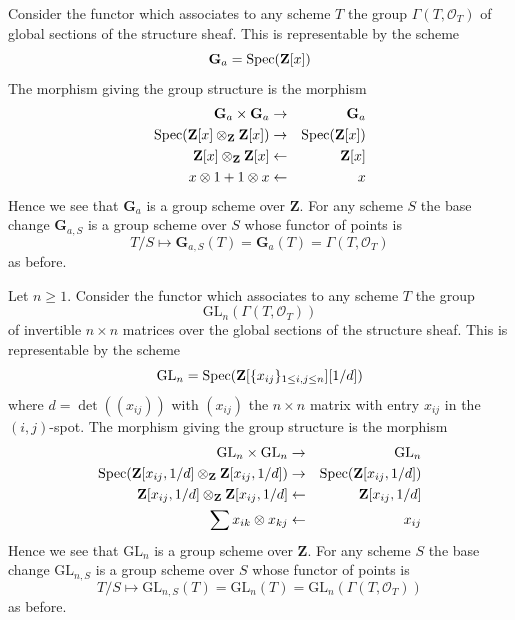 \begin{example}
\label{example-additive-group}
Consider the functor which associates
to any scheme $T$ the group $\Gamma(T, \mathcal{O}_T)$
of global sections of the structure sheaf.
This is representable by the scheme
$$
\mathbf{G}_a = \mathop{\mathrm{Spec}}(\mathbf{Z}[x])
$$
The morphism giving the group structure is the morphism
\begin{eqnarray*}
\mathbf{G}_a \times \mathbf{G}_a & \to & \mathbf{G}_a \\
\mathop{\mathrm{Spec}}(\mathbf{Z}[x] \otimes_{\mathbf{Z}} \mathbf{Z}[x])
& \to &
\mathop{\mathrm{Spec}}(\mathbf{Z}[x]) \\
\mathbf{Z}[x] \otimes_{\mathbf{Z}} \mathbf{Z}[x]
& \leftarrow &
\mathbf{Z}[x] \\
x \otimes 1 + 1 \otimes x & \leftarrow & x
\end{eqnarray*}
Hence we see that $\mathbf{G}_a$ is a group scheme over $\mathbf{Z}$.
For any scheme $S$ the base change $\mathbf{G}_{a, S}$ is a
group scheme over $S$ whose functor of points is
$$
T/S
\longmapsto
\mathbf{G}_{a, S}(T) = \mathbf{G}_a(T) = \Gamma(T, \mathcal{O}_T)
$$
as before.
\end{example}

\begin{example}
\label{example-general-linear-group}
Let $n \geq 1$.
Consider the functor which associates
to any scheme $T$ the group
$$
\text{GL}_n(\Gamma(T, \mathcal{O}_T))
$$
of invertible $n \times n$ matrices over
the global sections of the structure sheaf.
This is representable by the scheme
$$
\text{GL}_n = \mathop{\mathrm{Spec}}(\mathbf{Z}[\{x_{ij}\}_{1 \leq i, j \leq n}][1/d])
$$
where $d = \det((x_{ij}))$ with $(x_{ij})$ the $n \times n$ matrix
with entry $x_{ij}$ in the $(i, j)$-spot.
The morphism giving the group structure is the morphism
\begin{eqnarray*}
\text{GL}_n \times \text{GL}_n & \to & \text{GL}_n \\
\mathop{\mathrm{Spec}}(\mathbf{Z}[x_{ij}, 1/d] \otimes_{\mathbf{Z}}
\mathbf{Z}[x_{ij}, 1/d])
& \to &
\mathop{\mathrm{Spec}}(\mathbf{Z}[x_{ij}, 1/d]) \\
\mathbf{Z}[x_{ij}, 1/d] \otimes_{\mathbf{Z}} \mathbf{Z}[x_{ij}, 1/d]
& \leftarrow &
\mathbf{Z}[x_{ij}, 1/d] \\
\sum x_{ik} \otimes x_{kj} & \leftarrow & x_{ij}
\end{eqnarray*}
Hence we see that $\text{GL}_n$ is a group scheme over $\mathbf{Z}$.
For any scheme $S$ the base change $\text{GL}_{n, S}$ is a
group scheme over $S$ whose functor of points is
$$
T/S
\longmapsto
\text{GL}_{n, S}(T) = \text{GL}_n(T) =\text{GL}_n(\Gamma(T, \mathcal{O}_T))
$$
as before.
\end{example}

